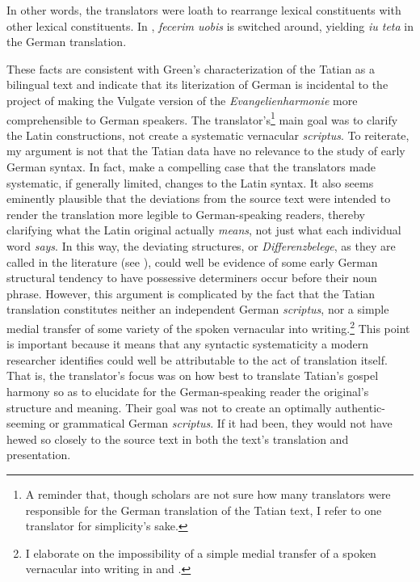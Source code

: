 \noindent In other words, the translators were loath to rearrange lexical constituents with other lexical constituents. In , \textit{fecerim uobis} is switched around, yielding \textit{iu teta} in the German translation.

These facts are consistent with Green’s characterization of the Tatian as a bilingual text and indicate that its literization of German is incidental to the project of making the Vulgate version of the \textit{Evangelienharmonie} more comprehensible to German speakers. The translator’s\footnote{A reminder that, though scholars are not sure how many translators were responsible for the German translation of the Tatian text, I refer to one translator for simplicity’s sake.} main goal was to clarify the Latin constructions, not create a systematic vernacular \textit{scriptus}. To reiterate, my argument is not that the Tatian data have no relevance to the study of early German syntax. In fact, \citet{DittmerDittmer1998} make a compelling case that the translators made systematic, if generally limited, changes to the Latin syntax. It also seems eminently plausible that the deviations from the source text were intended to render the translation more legible to German-speaking readers, thereby clarifying what the Latin original actually \textit{means}, not just what each individual word \textit{says}. In this way, the deviating structures, or \textit{Differenzbelege}, as they are called in the literature (see ), could well be evidence of some early German structural tendency to have possessive determiners occur before their noun phrase. However, this argument is complicated by the fact that the Tatian translation constitutes neither an independent German \textit{scriptus}, nor a simple medial transfer of some variety of the spoken vernacular into writing.\footnote{I elaborate on the impossibility of a simple medial transfer of a spoken vernacular into writing in  and .} This point is important because it means that any syntactic systematicity a modern researcher identifies could well be attributable to the act of translation itself. That is, the translator’s focus was on how best to translate Tatian’s gospel harmony so as to elucidate for the German-speaking reader the original’s structure and meaning. Their goal was not to create an optimally authentic-seeming or grammatical German \textit{scriptus}. If it had been, they would not have hewed so closely to the source text in both the text’s translation and presentation.

